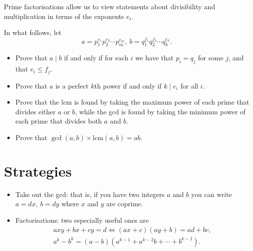 \documentclass{article}
\begin{document}
  Prime factorisations allow us to view statements about divisibility and
  multiplication in terms of the exponents $e_i$.

  In what follows, let 
  \[a=p_1^{e_1}p_2^{e_2}\cdots p_m^{e_m},\
        b=q_1^{f_1}q_2^{f_2}\cdots q_k^{e_k}.\]
  \begin{itemize}
    \item Prove that $a\mid b$ if and only if for each $i$ we have that $p_i=q_j$
      for some $j$, and that $e_i\le f_j$.
    \item Prove that $a$ is a perfect $k$th power if and only if $k\mid e_i$ for all $i$.
    \item Prove that the lcm is found by taking the maximum power of each prime that
      divides either $a$ or $b$, while the gcd is found by taking the minimum power of
      each prime that divides both $a$ and $b$.
    \item Prove that $\gcd(a,b)\times\mathrm{lcm}(a,b)=ab$.
  \end{itemize}
\section{Strategies}
  \begin{itemize}
    \item Take out the gcd: that is, if you have two integers $a$ and $b$ you
      can write $a=dx,\ b=dy$ where $x$ and $y$ are coprime.
    \item Factorisations: two especially useful ones are
      \begin{align*}
        axy+bx+cy=d\iff (ax+c)(ay+b)=ad+bc, \\
        a^k-b^k=(a-b)\left(a^{k-1}+a^{k-2}b+\cdots+b^{k-1}\right).
      \end{align*}
  \end{itemize}
\end{document}
